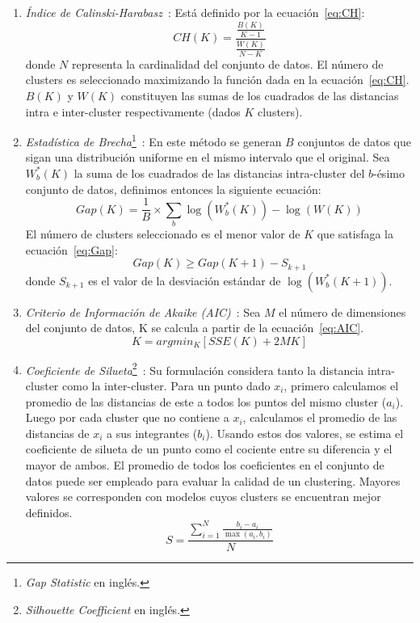 \begin{enumerate}
    \item \textit{Índice de Calinski-Harabasz}~\cite{Calinski74}: Está definido por la ecuación~\ref{eq:CH}:
    \begin{equation}
        \label{eq:CH}
        CH(K)=\frac{\frac{B(K)}{K-1}}{\frac{W(K)}{N-K}}
    \end{equation}
    donde $N$ representa la cardinalidad del conjunto de datos.
    El número de clusters es seleccionado maximizando la función dada en la ecuación~\ref{eq:CH}.
    $B(K)$ y $W(K)$ constituyen las sumas de los cuadrados de las distancias intra e inter-cluster respectivamente (dados $K$ clusters).

    \item \textit{Estadística de Brecha}\footnote{\textit{Gap Statistic} en inglés.}~\cite{Tibshirani01}: En este método se generan $B$ conjuntos de datos que sigan una distribución uniforme en el mismo intervalo que el original.
    Sea $W_{b}^{*}(K)$ la suma de los cuadrados de las distancias intra-cluster del $b$-ésimo conjunto de datos, definimos entonces la siguiente ecuación:
    \begin{equation}
        Gap(K) = \frac{1}{B} \times\sum_{b}{\log(W_{b}^{*}(K)) - \log(W(K))}
    \end{equation}
    El número de clusters seleccionado es el menor valor de $K$ que satisfaga la ecuación~\ref{eq:Gap}:
    \begin{equation}
        \label{eq:Gap}
        Gap(K) \geq Gap(K+1) - S_{k+1}
    \end{equation}
    donde $S_{k+1}$ es el valor de la desviación estándar de $\log(W_{b}^{*}(K+1))$.

    \item \textit{Criterio de Información de Akaike (AIC)}~\cite{Yeung01}: Sea $M$ el número de dimensiones del conjunto de datos, K se calcula a partir de la ecuación~\ref{eq:AIC}.
    \begin{equation}
        \label{eq:AIC}
        K=argmin_{K}[SSE(K)+2M K]
    \end{equation}

    \item \textit{Coeficiente de Silueta}\footnote{\textit{Silhouette Coefficient} en inglés.}~\cite{Kaufman90}: Su formulación considera tanto la distancia intra-cluster como la inter-cluster.
    Para un punto dado $x_i$, primero calculamos el promedio de las distancias de este a todos los puntos del mismo cluster ($a_i$).
    Luego por cada cluster que no contiene a $x_i$, calculamos el promedio de las distancias de $x_i$ a sus integrantes ($b_i$).
    Usando estos dos valores, se estima el coeficiente de silueta de un punto como el cociente entre su diferencia y el mayor de ambos.
    El promedio de todos los coeficientes en el conjunto de datos puede ser empleado para evaluar la calidad de un clustering.
    Mayores valores se corresponden con modelos cuyos clusters se encuentran mejor definidos.
    \begin{equation}
        S = \frac{\sum_{i=1}^{N}{\frac{b_{i}-a_{i}}{\max(a_i,b_i)}}}{N}
    \end{equation}
\end{enumerate}

